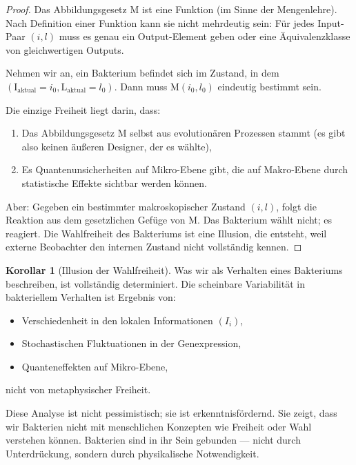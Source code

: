 \documentclass[a4paper,12pt]{article}
\theoremstyle{definition}
\newtheorem{korollar}{Korollar}
\begin{document}
\begin{proof}
Das Abbildungsgesetz $\text{M}$ ist eine Funktion (im Sinne der Mengenlehre). Nach Definition einer Funktion kann sie nicht mehrdeutig sein: Für jedes Input-Paar $(i, l)$ muss es genau ein Output-Element geben oder eine Äquivalenzklasse von gleichwertigen Outputs.

Nehmen wir an, ein Bakterium befindet sich im Zustand, in dem $(\text{I}_{\text{aktual}} = i_0, \text{L}_{\text{aktual}} = l_0)$. Dann muss $\text{M}(i_0, l_0)$ eindeutig bestimmt sein.

Die einzige Freiheit liegt darin, dass:
\begin{enumerate}
    \item Das Abbildungsgesetz $\text{M}$ selbst aus evolutionären Prozessen stammt (es gibt also keinen äußeren Designer, der es wählte),
    \item Es Quantenunsicherheiten auf Mikro-Ebene gibt, die auf Makro-Ebene durch statistische Effekte sichtbar werden können.
\end{enumerate}

Aber: Gegeben ein bestimmter makroskopischer Zustand $(i, l)$, folgt die Reaktion aus dem gesetzlichen Gefüge von $\text{M}$. Das Bakterium wählt nicht; es reagiert. Die Wahlfreiheit des Bakteriums ist eine Illusion, die entsteht, weil externe Beobachter den internen Zustand nicht vollständig kennen.
\end{proof}

\begin{korollar}[Illusion der Wahlfreiheit]
Was wir als Verhalten eines Bakteriums beschreiben, ist vollständig determiniert. Die scheinbare Variabilität in bakteriellem Verhalten ist Ergebnis von:
\begin{itemize}
    \item[-] Verschiedenheit in den lokalen Informationen $(I_i)$,
    \item[-] Stochastischen Fluktuationen in der Genexpression,
    \item[-] Quanteneffekten auf Mikro-Ebene,
\end{itemize}
nicht von metaphysischer Freiheit.
\end{korollar}

Diese Analyse ist nicht pessimistisch; sie ist erkenntnisfördernd. Sie zeigt, dass wir Bakterien nicht mit menschlichen Konzepten wie Freiheit oder Wahl verstehen können. Bakterien sind in ihr Sein gebunden --- nicht durch Unterdrückung, sondern durch physikalische Notwendigkeit.
\end{document}
